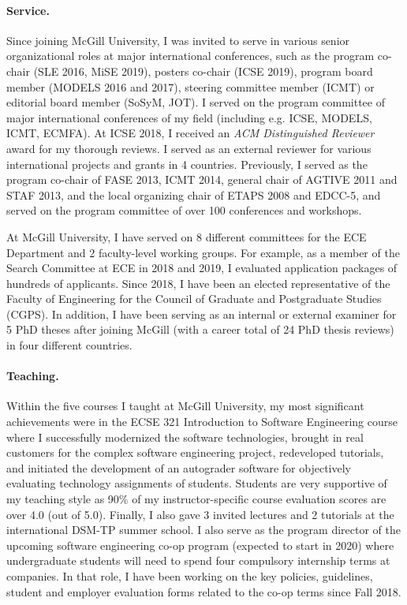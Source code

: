 \paragraph{Service.}
Since joining McGill University, I was invited to serve in various senior organizational roles at major international conferences, such as the program co-chair (SLE 2016, MiSE 2019), posters co-chair (ICSE 2019), program board member (MODELS 2016 and 2017), steering committee member (ICMT) or editorial board member (SoSyM, JOT). I served on the program committee of major international conferences of my field (including e.g. ICSE, MODELS, ICMT, ECMFA). At ICSE 2018, I received an \emph{ACM Distinguished Reviewer} award for my thorough reviews. I served as an external reviewer for various international projects and grants in 4 countries. Previously, I served as the program co-chair of FASE 2013, ICMT 2014, general chair of AGTIVE 2011 and STAF 2013, and the local organizing chair of ETAPS 2008 and EDCC-5, and served on the program committee of over 100 conferences and workshops.

At McGill University, I have served on 8 different committees for the ECE Department and 2 faculty-level working groups. For example, as a member of the Search Committee at ECE in 2018 and 2019, I evaluated application packages of hundreds of applicants. Since 2018, I have been an elected representative of the Faculty of Engineering for the Council of Graduate and Postgraduate Studies (CGPS). In addition, I have been serving as an internal or external examiner for 5 PhD theses after joining McGill (with a career total of 24 PhD thesis reviews) in four different countries.


\paragraph{Teaching.}
Within the five courses I taught at McGill University, my most significant achievements were in the ECSE 321 Introduction to Software Engineering course where I successfully modernized the software technologies, brought in real customers for the complex software engineering project, redeveloped tutorials, and initiated the development of an autograder software for objectively evaluating technology assignments of students. Students are very supportive of my teaching style as 90\% of my instructor-specific course evaluation scores are over 4.0 (out of 5.0). Finally, I also gave 3 invited lectures and 2 tutorials at the international DSM-TP summer school. I also serve as the program director of the upcoming software engineering co-op program (expected to start in 2020) where undergraduate students will need to spend four compulsory internship terms at companies. In that role, I have been working on the key policies, guidelines, student and employer evaluation forms related to the co-op terms since Fall 2018.


